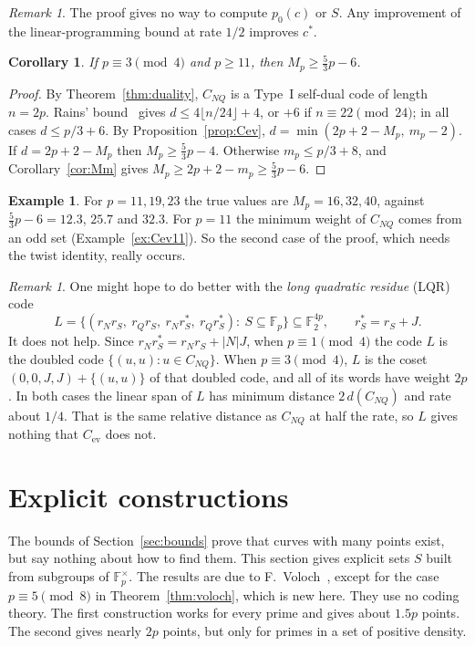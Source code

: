 \documentclass[12pt,letterpaper]{article}
\newtheorem{corollary}[theorem]{Corollary}
\theoremstyle{definition}
\newtheorem{example}[theorem]{Example}
\theoremstyle{remark}
\newtheorem{remark}[theorem]{Remark}
\numberwithin{equation}{section}
\newcommand{\F}{\mathbb{F}}
\newcommand{\Fp}{\mathbb{F}_p}
\newcommand{\CNQ}{C_{NQ}}
\newcommand{\Cev}{C_{\mathrm{ev}}}
\begin{document}
\begin{remark}
The proof gives no way to compute $p_0(c)$ or $S$. Any improvement of the
linear-programming bound at rate $1/2$ improves $c^*$.
\end{remark}

\begin{corollary}\label{cor:53}
If $p\equiv3\pmod4$ and $p\ge11$, then $M_p\ge\frac53p-6$.
\end{corollary}

\begin{proof}
By Theorem~\ref{thm:duality}, $\CNQ$ is a Type~I self-dual code of length
$n=2p$. Rains' bound~\cite{Ra98} gives $d\le4\lfloor n/24\rfloor+4$, or
$+6$ if $n\equiv22\pmod{24}$; in all cases $d\le p/3+6$. By
Proposition~\ref{prop:Cev}, $d=\min(2p+2-M_p,\ m_p-2)$. If $d=2p+2-M_p$ then
$M_p\ge\frac53p-4$. Otherwise $m_p\le p/3+8$, and Corollary~\ref{cor:Mm} gives
$M_p\ge2p+2-m_p\ge\frac53p-6$.
\end{proof}

\begin{example}
For $p=11,19,23$ the true values are $M_p=16,32,40$, against $\frac53p-6=12.3$,
$25.7$ and $32.3$. For $p=11$ the minimum weight of $\CNQ$ comes from an odd set
(Example~\ref{ex:Cev11}). So the second case of the proof, which needs the twist
identity, really occurs.
\end{example}

\begin{remark}\label{rem:LQR}
One might hope to do better with the \emph{long quadratic residue} (LQR) code
\[
L=\{(r_Nr_S,\ r_Qr_S,\ r_Nr_S^*,\ r_Qr_S^*):\ S\subseteq\Fp\}\subseteq\F_2^{4p},
\qquad r_S^*=r_S+J .
\]
It does not help. Since $r_Nr_S^*=r_Nr_S+|N|J$, when $p\equiv1\pmod4$ the code $L$
is the doubled code $\{(u,u):u\in\CNQ\}$. When $p\equiv3\pmod 4$, $L$ is the coset
$(0,0,J,J)+\{(u,u)\}$ of that doubled code, and all of its words have weight $2p$.
In both cases the linear span of $L$ has minimum distance $2\,d(\CNQ)$ and rate
about $1/4$. That is the same relative distance as $\CNQ$ at half the rate, so $L$
gives nothing that $\Cev$ does not.
\end{remark}

\section{Explicit constructions}
\label{sec:voloch}

The bounds of Section~\ref{sec:bounds} prove that curves with many points exist,
but say nothing about how to find them. This section gives explicit sets $S$ built
from subgroups of $\Fp^\times$. The results are due to F.~Voloch~\cite{Vo06}, except
for the case $p\equiv5\pmod8$ in Theorem~\ref{thm:voloch}, which is new here. They
use no coding theory. The first construction works for every prime and gives about
$1.5p$ points. The second gives nearly $2p$ points, but only for primes in a set of
positive density.
\end{document}
